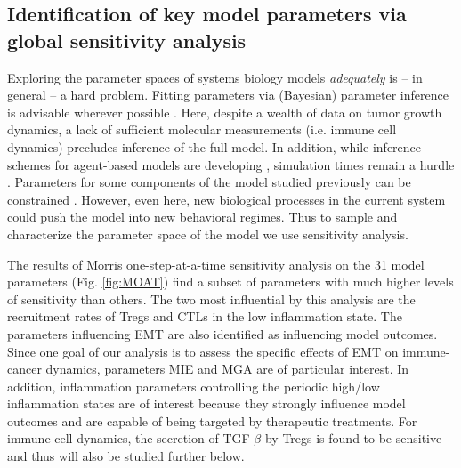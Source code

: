 \documentclass[11pt]{article}
\begin{document}
\subsection{Identification of key model parameters via global sensitivity analysis}\label{SensAnalysis}
Exploring the parameter spaces of systems biology models {\em adequately} is -- in general -- a hard problem. Fitting parameters via (Bayesian) parameter inference is advisable wherever possible \cite{kirk13_model}. Here, despite a wealth of data on tumor growth dynamics, a lack of sufficient molecular measurements (i.e. immune cell dynamics) precludes inference of the full model. In addition, while inference schemes for agent-based models are developing \cite{gallaher17_hybrid, warne19_simulation}, simulation times remain a hurdle \cite{lambert18_bayesian}. Parameters for some components of the model studied previously can be constrained \cite{guo17_multiscale}. However, even here, new biological processes in the current system could push the model into new behavioral regimes. Thus to sample and characterize the parameter space of the model we use sensitivity analysis.   
\par
The results of Morris one-step-at-a-time sensitivity analysis on the 31 model parameters (Fig. \ref{fig:MOAT}) find a subset of parameters with much higher levels of sensitivity than others. The two most influential by this analysis are the recruitment rates of Tregs and CTLs in the low inflammation state. The parameters influencing EMT are also identified as influencing model outcomes. Since one goal of our analysis is to assess the specific effects of EMT on immune-cancer dynamics, parameters MIE and MGA are of particular interest.
In addition, inflammation parameters controlling the periodic high/low inflammation states are of interest because they strongly influence model outcomes and are capable of being targeted by therapeutic treatments. For immune cell dynamics, the secretion of TGF-$\beta$ by Tregs is found to be sensitive and thus will also be studied further below.


\end{document}
